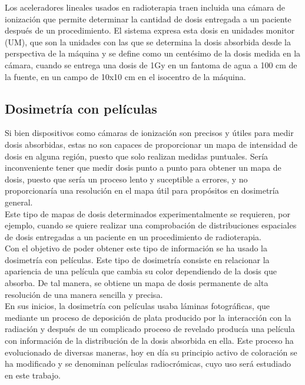 Los aceleradores lineales usados en radioterapia traen incluida una cámara de ionización que permite determinar la cantidad de dosis entregada a un paciente después de un procedimiento. El sistema expresa esta dosis en unidades monitor (UM), que son la unidades con las que se determina la dosis absorbida desde la perspectiva de la máquina y se define como un centésimo de la dosis medida en la cámara, cuando se entrega una dosis de 1Gy en un fantoma de agua a 100 cm de la fuente, en un campo de 10x10 cm en el isocentro de la máquina.

\subsection{Dosimetría con películas}
Si bien dispositivos como cámaras de ionización son precisos y útiles para medir dosis absorbidas, estas no son capaces de proporcionar un mapa de intensidad de dosis en alguna región, puesto que solo realizan medidas puntuales. Sería inconveniente tener que medir dosis punto a punto para obtener un mapa de dosis, puesto que sería un proceso lento y suceptible a errores, y no proporcionaría una resolución en el mapa útil para propósitos en dosimetría general. \\

Este tipo de mapas de dosis determinados experimentalmente se requieren, por ejemplo, cuando se quiere realizar una comprobación de distribuciones espaciales de dosis entregadas a un paciente en un procedimiento de radioterapia.\\

Con el objetivo de poder obtener este tipo de información se ha usado la dosimetría con películas. Este tipo de dosimetría consiste en relacionar la apariencia de una película que cambia su color dependiendo de la dosis que absorba. De tal manera, se obtiene un mapa de dosis permanente de alta resolución de una manera sencilla y precisa.\\

En sus inicios, la dosimetría con películas usaba láminas fotográficas, que mediante un proceso de deposición de plata producido por la interacción con la radiación y después de un complicado proceso de revelado producía una película con información de la distribución de la dosis absorbida en ella. Este proceso ha evolucionado de diversas maneras, hoy en día su principio activo de coloración se ha modificado y se denominan películas radiocrómicas, cuyo uso será estudiado en este trabajo.\\

